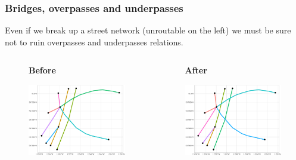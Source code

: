 \documentclass[c,10pt,pdftex]{beamer}
\begin{document}
\begin{frame}
\frametitle{Bridges, overpasses and underpasses}
\vspace{-0.75cm}
Even if we break up a street network (unroutable on the left) we must be sure  not to ruin overpasses and underpasses relations. 
\begin{columns}
	\begin{column}{0.5\linewidth}
		\begin{figure}
			\centering
			\large \textbf{Before} \par \medskip
			\includegraphics[width = \linewidth, trim = {4cm 0 3.75cm 0}, clip]{images/overpasses1}
		\end{figure}
	\end{column}
\begin{column}{0.5\linewidth}
	\begin{figure}
		\centering
		\large \textbf{After} \par \medskip
		\includegraphics[width = \linewidth, trim = {4cm 0 3.75cm 0}, clip]{images/overpasses2}
	\end{figure}
\end{column}
\end{columns}
\end{frame}
\end{document}
